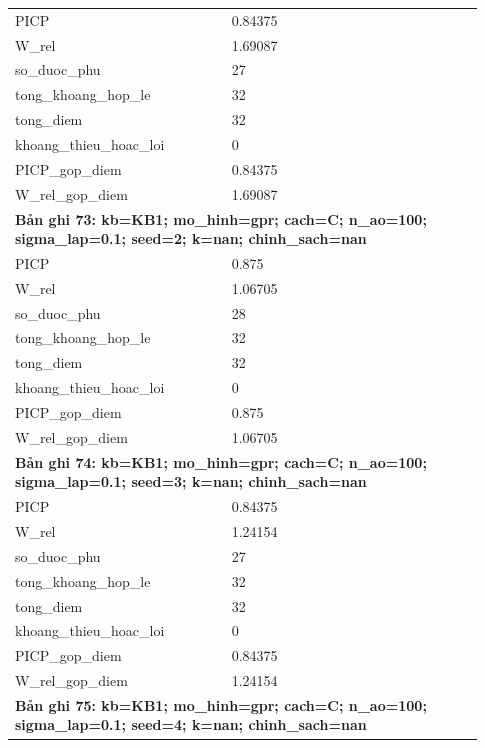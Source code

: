 \begin{longtable}{p{0.43\linewidth}p{0.50\linewidth}}
PICP & 0.84375 \\
W\_\allowbreak rel & 1.69087 \\
so\_\allowbreak duoc\_\allowbreak phu & 27 \\
tong\_\allowbreak khoang\_\allowbreak hop\_\allowbreak le & 32 \\
tong\_\allowbreak diem & 32 \\
khoang\_\allowbreak thieu\_\allowbreak hoac\_\allowbreak loi & 0 \\
PICP\_\allowbreak gop\_\allowbreak diem & 0.84375 \\
W\_\allowbreak rel\_\allowbreak gop\_\allowbreak diem & 1.69087 \\
\midrule
\multicolumn{2}{p{0.95\linewidth}}{\textbf{Bản ghi 73: kb=KB1; mo\_hinh=gpr; cach=C; n\_ao=100; sigma\_lap=0.1; seed=2; k=nan; chinh\_sach=nan}} \\
PICP & 0.875 \\
W\_\allowbreak rel & 1.06705 \\
so\_\allowbreak duoc\_\allowbreak phu & 28 \\
tong\_\allowbreak khoang\_\allowbreak hop\_\allowbreak le & 32 \\
tong\_\allowbreak diem & 32 \\
khoang\_\allowbreak thieu\_\allowbreak hoac\_\allowbreak loi & 0 \\
PICP\_\allowbreak gop\_\allowbreak diem & 0.875 \\
W\_\allowbreak rel\_\allowbreak gop\_\allowbreak diem & 1.06705 \\
\midrule
\multicolumn{2}{p{0.95\linewidth}}{\textbf{Bản ghi 74: kb=KB1; mo\_hinh=gpr; cach=C; n\_ao=100; sigma\_lap=0.1; seed=3; k=nan; chinh\_sach=nan}} \\
PICP & 0.84375 \\
W\_\allowbreak rel & 1.24154 \\
so\_\allowbreak duoc\_\allowbreak phu & 27 \\
tong\_\allowbreak khoang\_\allowbreak hop\_\allowbreak le & 32 \\
tong\_\allowbreak diem & 32 \\
khoang\_\allowbreak thieu\_\allowbreak hoac\_\allowbreak loi & 0 \\
PICP\_\allowbreak gop\_\allowbreak diem & 0.84375 \\
W\_\allowbreak rel\_\allowbreak gop\_\allowbreak diem & 1.24154 \\
\midrule
\multicolumn{2}{p{0.95\linewidth}}{\textbf{Bản ghi 75: kb=KB1; mo\_hinh=gpr; cach=C; n\_ao=100; sigma\_lap=0.1; seed=4; k=nan; chinh\_sach=nan}} \\

\end{longtable}
